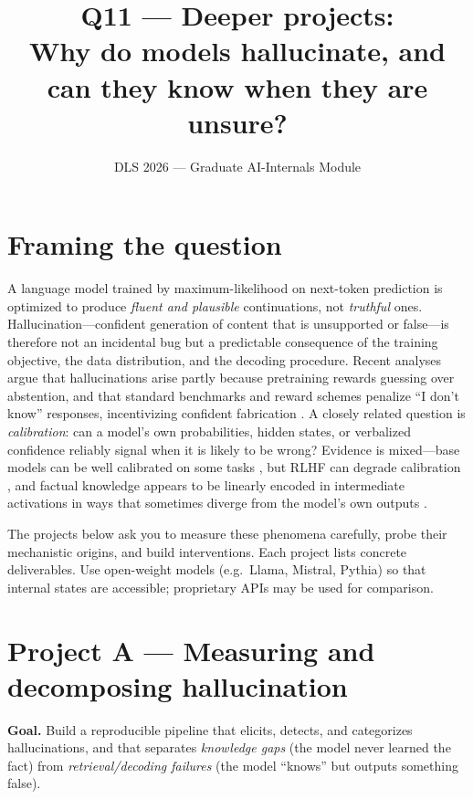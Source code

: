 \documentclass[11pt]{article}
\title{Q11 --- Deeper projects:\\ Why do models hallucinate, and can they know when they are unsure?}
\author{DLS 2026 --- Graduate AI-Internals Module}
\date{}
\begin{document}
\maketitle

\section*{Framing the question}

A language model trained by maximum-likelihood on next-token prediction is
optimized to produce \emph{fluent and plausible} continuations, not
\emph{truthful} ones. Hallucination---confident generation of content that is
unsupported or false---is therefore not an incidental bug but a predictable
consequence of the training objective, the data distribution, and the decoding
procedure. Recent analyses argue that hallucinations arise partly because
pretraining rewards guessing over abstention, and that standard benchmarks and
reward schemes penalize ``I don't know'' responses, incentivizing confident
fabrication \citep{kalai2025hallucinate,maynez2020faithfulness}. A closely
related question is \emph{calibration}: can a model's own probabilities, hidden
states, or verbalized confidence reliably signal when it is likely to be wrong?
Evidence is mixed---base models can be well calibrated on some tasks
\citep{kadavath2022know}, but RLHF can degrade calibration
\citep{openai2023gpt4}, and factual knowledge appears to be linearly encoded in
intermediate activations in ways that sometimes diverge from the model's own
outputs \citep{azaria2023internal,burns2023discovering}.

The projects below ask you to measure these phenomena carefully, probe their
mechanistic origins, and build interventions. Each project lists concrete
deliverables. Use open-weight models (e.g.\ Llama, Mistral, Pythia) so that
internal states are accessible; proprietary APIs may be used for comparison.

\section{Project A --- Measuring and decomposing hallucination}

\textbf{Goal.} Build a reproducible pipeline that elicits, detects, and
categorizes hallucinations, and that separates \emph{knowledge gaps} (the model
never learned the fact) from \emph{retrieval/decoding failures} (the model
``knows'' but outputs something false).
\end{document}

